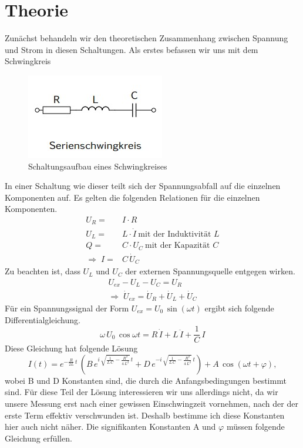 \documentclass[a4paper, 12pt,]{scrartcl}
\begin{document}
\section{Theorie}
Zunächst behandeln wir den theoretischen Zusammenhang zwischen Spannung und Strom in diesen Schaltungen. Als erstes befassen wir uns mit dem Schwingkreis
\begin{figure}[H]\centering\includegraphics[scale=1]{SeSK}\caption{Schaltungsaufbau eines Schwingkreises}\end{figure}
In einer Schaltung wie dieser teilt sich der Spannungsabfall auf die einzelnen Komponenten auf. Es gelten die folgenden Relationen für die einzelnen Komponenten.
\begin{align*}U_{R}=&I\cdot{R}\\
U_L=&L\cdot\dot{I}\:\text{mit der Induktivität }L\\
Q=&C\cdot{U_C}\:\text{mit der Kapazität }C\\
\Rightarrow\;I=&C\,\dot{U}_C\end{align*}
Zu beachten ist, dass $U_L$ und $U_C$ der externen Spannungsquelle entgegen wirken. 
\begin{gather*}U_{ex}-U_L-U_C=U_R\\
\Rightarrow\;\dot{U}_{ex}=\dot{U}_R+\dot{U}_L+\dot{U}_C\end{gather*}
Für ein Spannungssignal der Form $U_{ex}=U_0\,\sin(\omega{t})$ ergibt sich folgende Differentialgleichung.
\begin{equation*}\omega\,{U_0}\,\cos\omega{t}=R\,\dot{I}+L\,\ddot{I}+\frac{1}{C}\,I\end{equation*}
Diese Gleichung hat folgende Lösung
\begin{equation*}I(t)=e^{-\frac{R}{2L}\,t}\,\left(B\,e^{i\,\sqrt{\frac{1}{L\,C}-\frac{R^2}{4\,L^2}}\,t}+D\,e^{-i\,\sqrt{\frac{1}{L\,C}-\frac{R^2}{4\,L^2}}\,t}\right)+A\,\cos(\omega{t}+\varphi),\end{equation*}
wobei B und D Konstanten sind, die durch die Anfangsbedingungen bestimmt sind. Für diese Teil der Lösung interessieren wir uns allerdings nicht, da wir unsere Messung erst nach einer gewissen Einschwingzeit vornehmen, nach der der erste Term effektiv verschwunden ist. Deshalb bestimme ich diese Konstanten hier auch nicht näher. Die signifikanten Konstanten A und $\varphi$ müssen folgende Gleichung erfüllen.
\end{document}
